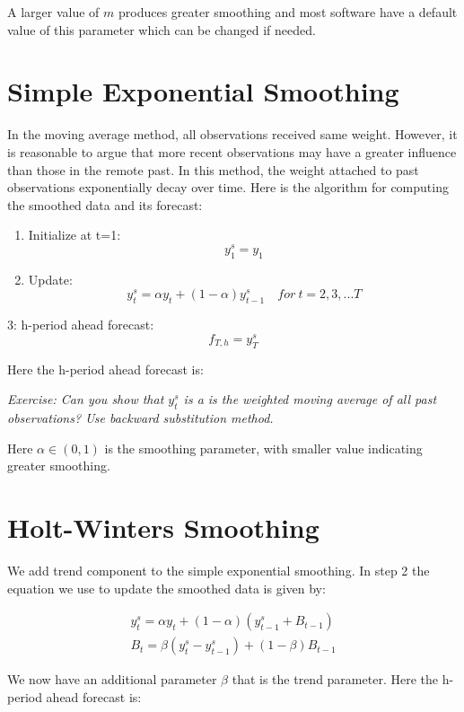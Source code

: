 \documentclass[]{book}
\theoremstyle{definition}
\theoremstyle{definition}
\theoremstyle{definition}
\theoremstyle{remark}
\begin{document}
A larger value of \(m\) produces greater smoothing and most software
have a default value of this parameter which can be changed if needed.

\hypertarget{simple-exponential-smoothing}{%
\section{Simple Exponential
Smoothing}\label{simple-exponential-smoothing}}

In the moving average method, all observations received same weight.
However, it is reasonable to argue that more recent observations may
have a greater influence than those in the remote past. In this method,
the weight attached to past observations exponentially decay over time.
Here is the algorithm for computing the smoothed data and its forecast:

\begin{enumerate}
\def\labelenumi{\arabic{enumi}.}
\item
  Initialize at t=1: \[y_1^s=y_1\]
\item
  Update:
  \[y_{t}^{s}= \alpha y_t + (1-\alpha)y_{t-1}^{s}  \quad for \ t=2,3,...T\]
\end{enumerate}

3: h-period ahead forecast: \[f_{T,h}= y_T^s\]

Here the h-period ahead forecast is:

\emph{Exercise: Can you show that \(y_{t}^{s}\) is a is the weighted
moving average of all past observations? Use backward substitution
method.}

Here \(\alpha \in (0,1)\) is the smoothing parameter, with smaller value
indicating greater smoothing.

\hypertarget{holt-winters-smoothing}{%
\section{Holt-Winters Smoothing}\label{holt-winters-smoothing}}

We add trend component to the simple exponential smoothing. In step 2
the equation we use to update the smoothed data is given by:

\begin{align}
    y_{t}^{s}= \alpha y_t + (1-\alpha)(y_{t-1}^{s}+B_{t-1}) \\ \nonumber
    B_t = \beta (y_t^s -y_{t-1}^s) + (1-\beta) B_{t-1}
 \end{align}

We now have an additional parameter \(\beta\) that is the trend
parameter. Here the h-period ahead forecast is:
\end{document}
